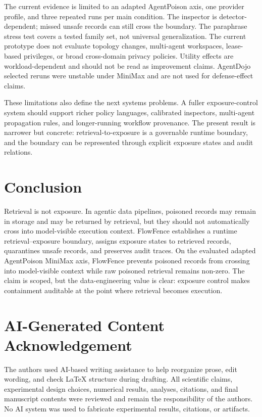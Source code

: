 \documentclass[conference]{IEEEtran}
\begin{document}
The current evidence is limited to an adapted AgentPoison axis, one provider profile, and three repeated runs per main condition. The inspector is detector-dependent; missed unsafe records can still cross the boundary. The paraphrase stress test covers a tested family set, not universal generalization. The current prototype does not evaluate topology changes, multi-agent workspaces, lease-based privileges, or broad cross-domain privacy policies. Utility effects are workload-dependent and should not be read as improvement claims. AgentDojo selected reruns were unstable under MiniMax and are not used for defense-effect claims.

These limitations also define the next systems problems. A fuller exposure-control system should support richer policy languages, calibrated inspectors, multi-agent propagation rules, and longer-running workflow provenance. The present result is narrower but concrete: retrieval-to-exposure is a governable runtime boundary, and the boundary can be represented through explicit exposure states and audit relations.

\section{Conclusion}

Retrieval is not exposure. In agentic data pipelines, poisoned records may remain in storage and may be returned by retrieval, but they should not automatically cross into model-visible execution context. FlowFence establishes a runtime retrieval--exposure boundary, assigns exposure states to retrieved records, quarantines unsafe records, and preserves audit traces. On the evaluated adapted AgentPoison MiniMax axis, FlowFence prevents poisoned records from crossing into model-visible context while raw poisoned retrieval remains non-zero. The claim is scoped, but the data-engineering value is clear: exposure control makes containment auditable at the point where retrieval becomes execution.

\section*{AI-Generated Content Acknowledgement}

The authors used AI-based writing assistance to help reorganize prose, edit wording, and check LaTeX structure during drafting. All scientific claims, experimental design choices, numerical results, analyses, citations, and final manuscript contents were reviewed and remain the responsibility of the authors. No AI system was used to fabricate experimental results, citations, or artifacts.



\end{document}
